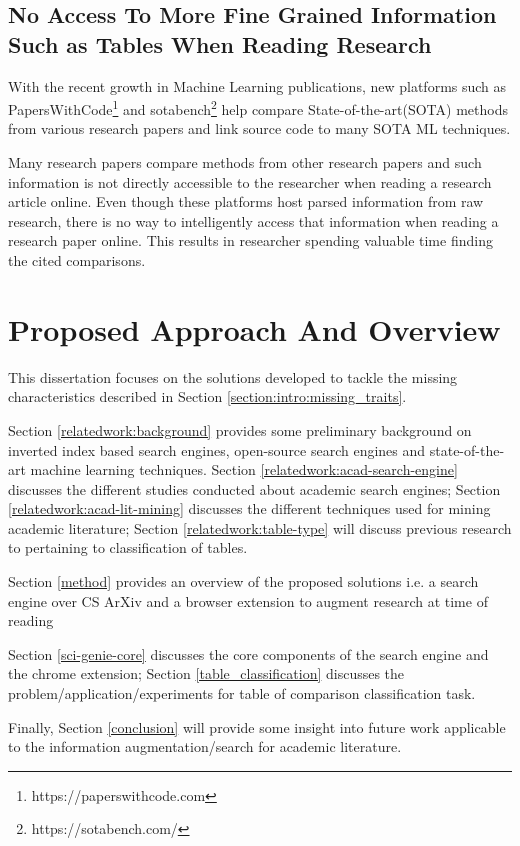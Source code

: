 \subsection{No Access To More Fine Grained Information Such as Tables When Reading Research}
With the recent growth in Machine Learning publications, new platforms such as PapersWithCode\footnote{https://paperswithcode.com} and 
sotabench\footnote{https://sotabench.com/} help compare State-of-the-art(SOTA) methods from various research papers and link source code 
to many SOTA ML techniques. 

Many research papers compare methods from other research papers and such information is not directly accessible to the
researcher when reading a research article online. Even though these platforms 
host parsed information from raw research, there is no way to intelligently access that information when reading a research paper online. 
This results in researcher spending valuable time finding the cited comparisons.

\section{Proposed Approach And Overview}
This dissertation focuses on the solutions developed to tackle the missing characteristics described in Section \ref{section:intro:missing_traits}. 

Section \ref{relatedwork:background} provides some preliminary background on inverted index based search engines, open-source search engines and state-of-the-art machine learning techniques.
Section \ref{relatedwork:acad-search-engine} discusses the different studies conducted about academic search engines; Section \ref{relatedwork:acad-lit-mining} discusses the different techniques used for mining academic literature; Section \ref{relatedwork:table-type} will discuss previous research to pertaining to classification of tables. 

Section \ref{method} provides an overview of the proposed solutions i.e. a search engine over CS ArXiv and a browser extension to augment research at time of reading 

Section \ref{sci-genie-core} discusses the core components of the search engine and the chrome extension; Section \ref{table_classification}
discusses the problem/application/experiments for table of comparison classification task.

Finally, Section \ref{conclusion} will provide some insight into future work applicable to the information augmentation/search for academic literature. 